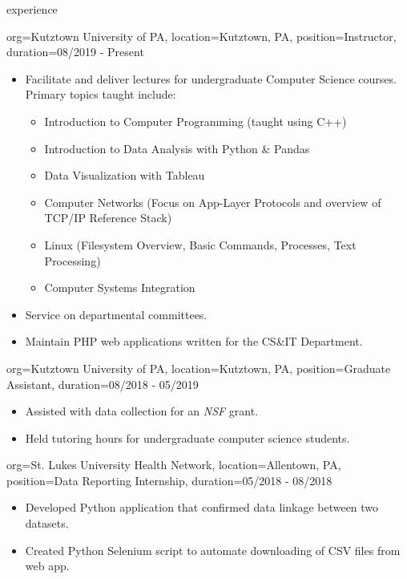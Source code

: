 \documentclass{resume}
\begin{document}
\makeheader

\begin{ResumeSection}{experience}
    \begin{ResumeSubsection}{org={Kutztown University of PA}, location={Kutztown, PA}, position={Instructor}, duration={08/2019 - Present}}
        \begin{itemize}
            \item Facilitate and deliver lectures for undergraduate Computer Science courses. Primary topics taught include: 
            \begin{itemize}
                \item Introduction to Computer Programming (taught using C++)
                \item Introduction to Data Analysis with Python \& Pandas
                \item Data Visualization with Tableau
                \item Computer Networks (Focus on App-Layer Protocols and overview of TCP/IP Reference Stack)
                \item Linux (Filesystem Overview, Basic Commands, Processes, Text Processing)
                \item Computer Systems Integration
            \end{itemize}
            \item Service on departmental committees.
            \item Maintain PHP web applications written for the CS\&IT Department.
        \end{itemize}
    \end{ResumeSubsection}    
    \begin{ResumeSubsection}{org={Kutztown University of PA}, location={Kutztown, PA}, position={Graduate Assistant}, duration={08/2018 - 05/2019}}
        \begin{itemize}
            \item Assisted with data collection for an \emph{NSF} grant.
            \item Held tutoring hours for undergraduate computer science students. 
        \end{itemize}
    \end{ResumeSubsection}
    \begin{ResumeSubsection}{org={St. Lukes University Health Network}, location={Allentown, PA}, position={Data Reporting Internship}, duration={05/2018 - 08/2018}}
        \begin{itemize}
            \item Developed Python application that confirmed data linkage between two datasets. 
            \item Created Python Selenium script to automate downloading of CSV files from web app.
        \end{itemize}
    \end{ResumeSubsection}
\end{ResumeSection}
\end{document}
